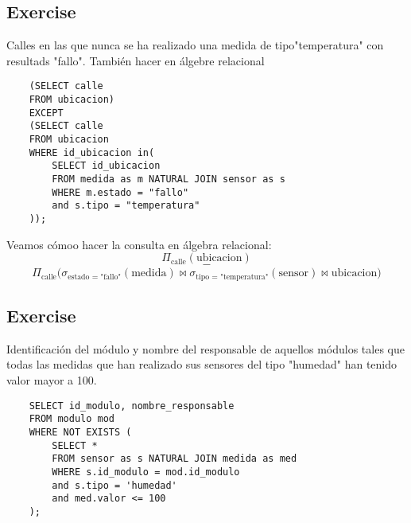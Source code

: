 \documentclass{article}
\begin{document}
\subsection{Exercise}
\noindent Calles en las que nunca se ha realizado una medida de tipo"temperatura"
con resultads "fallo". También hacer en álgebre relacional
\begin{lstlisting}
    (SELECT calle
    FROM ubicacion)
    EXCEPT
    (SELECT calle
    FROM ubicacion
    WHERE id_ubicacion in(
        SELECT id_ubicacion
        FROM medida as m NATURAL JOIN sensor as s
        WHERE m.estado = "fallo"
        and s.tipo = "temperatura"
    ));
\end{lstlisting}
\noindent Veamos cómoo hacer la consulta en álgebra relacional:
$$ \Pi_{\text{calle}}\left(\text{ubicacion}\right) $$
$$\boldsymbol{-}$$
$$ \Pi_{\text{calle}}\Big(
    \sigma_{\text{estado = "fallo"}}(
        \text{medida}) \Join
    \sigma_{\text{tipo = "temperatura"}}(
        \text{sensor}) \Join
    \text{ubicacion}
\Big) $$

\vspace{4mm}
\subsection{Exercise}
\noindent Identificación del módulo y nombre del responsable de aquellos
módulos tales que todas las medidas que han realizado sus sensores del tipo
"humedad" han tenido valor mayor a 100.
\begin{lstlisting}
    SELECT id_modulo, nombre_responsable
    FROM modulo mod
    WHERE NOT EXISTS (
        SELECT *
        FROM sensor as s NATURAL JOIN medida as med
        WHERE s.id_modulo = mod.id_modulo
        and s.tipo = 'humedad'
        and med.valor <= 100
    );
\end{lstlisting}
\end{document}
